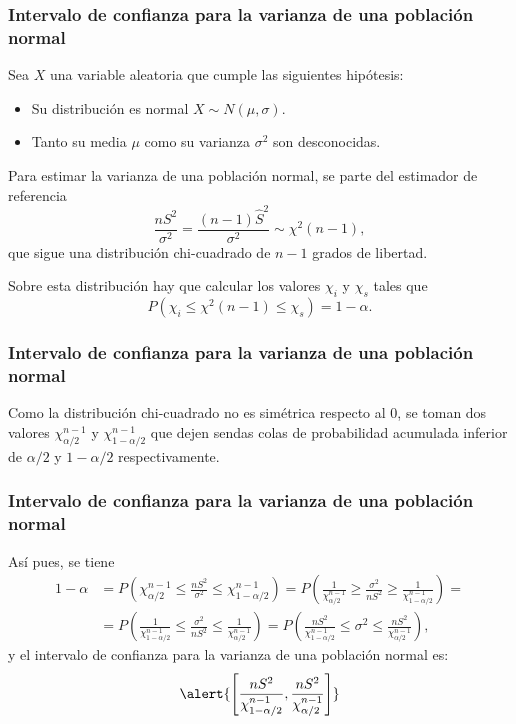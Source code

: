\begin{frame}
\frametitle{Intervalo de confianza para la varianza de una población normal}
Sea $X$ una variable aleatoria que cumple las siguientes hipótesis:
\begin{itemize}
\item Su distribución es normal $X\sim N(\mu,\sigma)$.
\item Tanto su media $\mu$ como su varianza $\sigma^2$ son desconocidas.
\end{itemize}

Para estimar la varianza de una población normal, se parte del estimador de referencia
\[
\frac{nS^2}{\sigma^2} = \frac{(n-1)\hat{S}^2}{\sigma^2}\sim \chi^2(n-1),
\]
que sigue una distribución chi-cuadrado de $n-1$ grados de libertad.

Sobre esta distribución hay que calcular los valores $\chi_i$ y $\chi_s$ tales que
\[
P(\chi_i\leq \chi^2(n-1) \leq \chi_s) = 1-\alpha.
\]
\end{frame}


\begin{frame}
\frametitle{Intervalo de confianza para la varianza de una población normal}
Como la distribución chi-cuadrado no es simétrica respecto al 0, se toman dos valores $\chi^{n-1}_{\alpha/2}$ y $\chi^{n-1}_{1-\alpha/2}$ que dejen sendas colas de probabilidad acumulada inferior de $\alpha/2$ y $1-\alpha/2$ respectivamente.
\begin{center}
\scalebox{0.8}{}
\end{center}
\end{frame}


\begin{frame}
\frametitle{Intervalo de confianza para la varianza de una población normal}
Así pues, se tiene
\[
\begin{align*}
1-\alpha &= P\left(\chi^{n-1}_{\alpha/2}\leq \frac{nS^2}{\sigma^2}  \leq \chi^{n-1}_{1-\alpha/2}\right) =
P\left(\frac{1}{\chi^{n-1}_{\alpha/2}}\geq \frac{\sigma^2}{nS^2}  \geq \frac{1}{\chi^{n-1}_{1-\alpha/2}}\right)=\\
&= P\left(\frac{1}{\chi^{n-1}_{1-\alpha/2}}\leq \frac{\sigma^2}{nS^2}  \leq \frac{1}{\chi^{n-1}_{\alpha/2}}\right)
= P\left(\frac{nS^2}{\chi^{n-1}_{1-\alpha/2}}\leq \sigma^2  \leq \frac{nS^2}{\chi^{n-1}_{\alpha/2}}\right),
\end{align*}
\]
y el intervalo de confianza para la varianza de una población normal es:
\[
\alert{\left[\frac{nS^2}{\chi^{n-1}_{1-\alpha/2}},\frac{nS^2}{\chi^{n-1}_{\alpha/2}}\right]}
\]
\end{frame}


